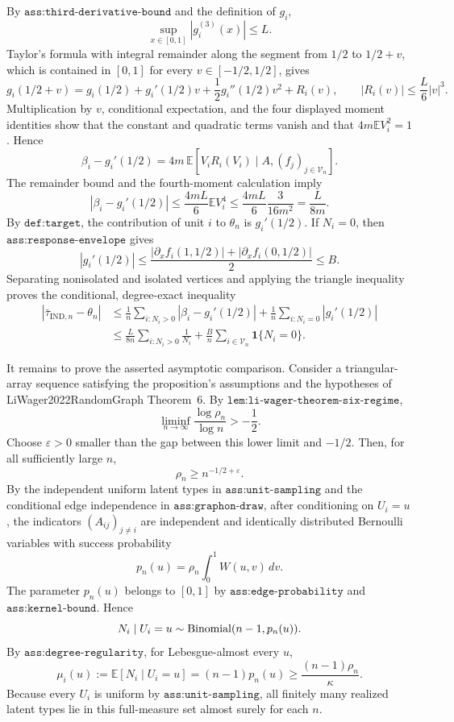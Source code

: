 By \(\texttt{ass:third-derivative-bound}\) and the definition of \(g_i\),
\[
\sup_{x\in[0,1]}|g_i^{(3)}(x)|\le L.
\]
Taylor's formula with integral remainder along the segment from \(1/2\) to \(1/2+v\), which is contained in \([0,1]\) for every \(v\in[-1/2,1/2]\), gives
\[
g_i(1/2+v)
=g_i(1/2)+g_i'(1/2)v+\frac12g_i''(1/2)v^2+R_i(v),
\qquad
|R_i(v)|\le\frac L6|v|^3.
\]
Multiplication by \(v\), conditional expectation, and the four displayed moment identities show that the constant and quadratic terms vanish and that \(4m\mathbb E V_i^2=1\).  Hence
\[
\beta_i-g_i'(1/2)
=4m\,\mathbb E\!\left[V_iR_i(V_i)\mid A,(f_j)_{j\in\mathcal V_n}\right].
\]
The remainder bound and the fourth-moment calculation imply
\[
|\beta_i-g_i'(1/2)|
\le \frac{4mL}{6}\mathbb E V_i^4
\le \frac{4mL}{6}\frac3{16m^2}
=\frac{L}{8m}.
\]
By \(\texttt{def:target}\), the contribution of unit \(i\) to \(\theta_n\) is \(g_i'(1/2)\).  If \(N_i=0\), then \(\texttt{ass:response-envelope}\) gives
\[
|g_i'(1/2)|
\le\frac{|\partial_x f_i(1,1/2)|+|\partial_x f_i(0,1/2)|}{2}
\le B.
\]
Separating nonisolated and isolated vertices and applying the triangle inequality proves the conditional, degree-exact inequality
\[
\begin{aligned}
|\bar\tau_{\mathrm{IND},n}-\theta_n|
&\le \frac1n\sum_{i:N_i>0}|\beta_i-g_i'(1/2)|
+\frac1n\sum_{i:N_i=0}|g_i'(1/2)|\\
&\le \frac{L}{8n}\sum_{i:N_i>0}\frac1{N_i}
+\frac Bn\sum_{i\in\mathcal V_n}\mathbf1\{N_i=0\}.
\end{aligned}
\]

It remains to prove the asserted asymptotic comparison.  Consider a triangular-array sequence satisfying the proposition's assumptions and the hypotheses of LiWager2022RandomGraph Theorem~6.  By \(\texttt{lem:li-wager-theorem-six-regime}\),
\[
\liminf_{n\to\infty}\frac{\log\rho_n}{\log n}>-\frac12.
\]
Choose \(\varepsilon>0\) smaller than the gap between this lower limit and \(-1/2\).  Then, for all sufficiently large \(n\),
\[
\rho_n\ge n^{-1/2+\varepsilon}.
\]
By the independent uniform latent types in \(\texttt{ass:unit-sampling}\) and the conditional edge independence in \(\texttt{ass:graphon-draw}\), after conditioning on \(U_i=u\), the indicators \((A_{ij})_{j\ne i}\) are independent and identically distributed Bernoulli variables with success probability
\[
p_n(u)=\rho_n\int_0^1W(u,v)\,dv.
\]
The parameter \(p_n(u)\) belongs to \([0,1]\) by \(\texttt{ass:edge-probability}\) and \(\texttt{ass:kernel-bound}\).  Hence
\[
N_i\mid U_i=u\sim {\rm Binomial}(n-1,p_n(u)).
\]
By \(\texttt{ass:degree-regularity}\), for Lebesgue-almost every \(u\),
\[
\mu_i(u):=\mathbb E[N_i\mid U_i=u]
=(n-1)p_n(u)
\ge\frac{(n-1)\rho_n}{\kappa}.
\]
Because every \(U_i\) is uniform by \(\texttt{ass:unit-sampling}\), all finitely many realized latent types lie in this full-measure set almost surely for each \(n\).

